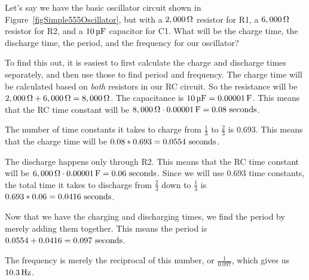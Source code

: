 \begin{exampleprob}
Let's say we have the basic oscillator circuit shown in Figure~\ref{figSimple555Oscillator}, but with a $2,000\,\si{\ohm}$ resistor for R1, a $6,000\,\si{\ohm}$ resistor for R2, and a $10\,\si{\micro\farad}$ capacitor for C1.  What will be the charge time, the discharge time, the period, and the frequency for our oscillator?

To find this out, it is easiest to first calculate the charge and discharge times separately, and then use those to find period and frequency.
The charge time will be calculated based on \emph{both} resistors in our RC circuit.
So the resistance will be $2,000\,\si{\ohm} + 6,000\,\si{\ohm} = 8,000\,\si{\ohm}$.
The capacitance is $10\,\si{\micro\farad} = 0.00001\,\si{\farad}$.
This means that the RC time constant will be $8,000\,\si{\ohm} \cdot 0.00001\,\si{\farad} = 0.08\textrm{ seconds}$.

The number of time constants it takes to charge from $\frac{1}{3}$ to $\frac{2}{3}$ is 0.693.
This means that the charge time will be $0.08 * 0.693 = 0.0554\textrm{ seconds}$.

The discharge happens only through R2.
This means that the RC time constant will be $6,000\,\si{\ohm} \cdot 0.00001\,\si{\farad} = 0.06\textrm{ seconds}$.
Since we will use 0.693 time constants, the total time it takes to discharge from $\frac{2}{3}$ down to $\frac{1}{3}$ is $0.693 * 0.06 = 0.0416\textrm{ seconds}$.

Now that we have the charging and discharging times, we find the period by merely adding them together.
This means the period is $0.0554 + 0.0416 = 0.097\textrm{ seconds}$.

The frequency is merely the reciprocal of this number, or $\frac{1}{0.097}$, which gives us $10.3\,\si{\hertz}$.
\end{exampleprob}

